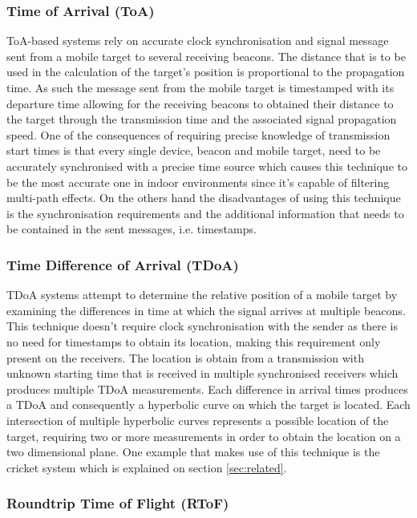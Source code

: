 \subsubsection{Time of Arrival (ToA) }
\label{subsubsec:toa}

\ac{ToA}-based systems rely on accurate clock synchronisation and signal message sent from a mobile target to several receiving beacons. The distance that is to be used in the calculation of the target's position is proportional to the propagation time. As such the message sent from the mobile target is timestamped with its departure time allowing for the receiving beacons to obtained their distance to the target through the transmission time and the associated signal propagation speed.
One of the consequences of requiring precise knowledge of transmission start times is that every single device, beacon and mobile target, need to be accurately synchronised with a precise time source which causes this technique to be the most accurate one in indoor environments since it's capable of filtering multi-path effects. On the others hand the disadvantages of using this technique is the synchronisation requirements and the additional information that needs to be contained in the sent messages, i.e. timestamps. 


\subsubsection{Time Difference of Arrival (TDoA) }
\label{subsubsec:tdoa}

\ac{TDoA} systems attempt to determine the relative position of a mobile target by examining the differences in time at which the signal arrives at multiple beacons. This technique doesn't require clock synchronisation with the sender as there is no need for timestamps to obtain its location, making this requirement only present on the receivers. The location is obtain from a transmission with unknown starting time that is received in multiple synchronised receivers which produces multiple \ac{TDoA} measurements. Each difference in arrival times produces a \ac{TDoA} and consequently a hyperbolic curve on which the target is located. Each intersection of multiple hyperbolic curves represents a possible location of the target, requiring two or more measurements in order to obtain the location on a two dimensional plane. One example that makes use of this technique is the cricket system which is explained on section \ref{sec:related}.


\subsubsection{Roundtrip Time of Flight (RToF)}
\label{subsubsec:rtfo}


